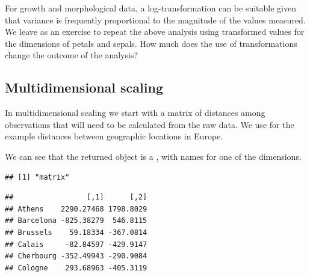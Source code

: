\documentclass[krantz2]{krantz}\usepackage{knitr}%
\begin{document}
\begin{playground}
For growth and morphological data, a log-transformation can be suitable given that variance is frequently proportional to the magnitude of the values measured. We leave as an exercise to repeat the above analysis using transformed values for the dimensions of petals and sepals. How much does the use of transformations change the outcome of the analysis?
\end{playground}

\subsection{Multidimensional scaling}\label{sec:stat:MDS}

In multidimensional scaling we start with a matrix of distances among observations that will need to be calculated from the raw data. We use for the example distances between geographic locations in Europe.

\begin{knitrout}\footnotesize
{}\color{fgcolor}\begin{kframe}
\begin{alltt}
 \hlkwb{<-} 
\end{alltt}
\end{kframe}
\end{knitrout}

We can see that the returned object  is a , with names for one of the dimensions.
\begin{knitrout}\footnotesize
{}\color{fgcolor}\begin{kframe}
\begin{alltt}
\end{alltt}
\begin{verbatim}
## [1] "matrix"
\end{verbatim}
\begin{alltt}
\end{alltt}
\begin{verbatim}
##                 [,1]      [,2]
## Athens    2290.27468 1798.8029
## Barcelona -825.38279  546.8115
## Brussels    59.18334 -367.0814
## Calais     -82.84597 -429.9147
## Cherbourg -352.49943 -290.9084
## Cologne    293.68963 -405.3119
\end{verbatim}
\end{kframe}
\end{knitrout}
\end{document}
